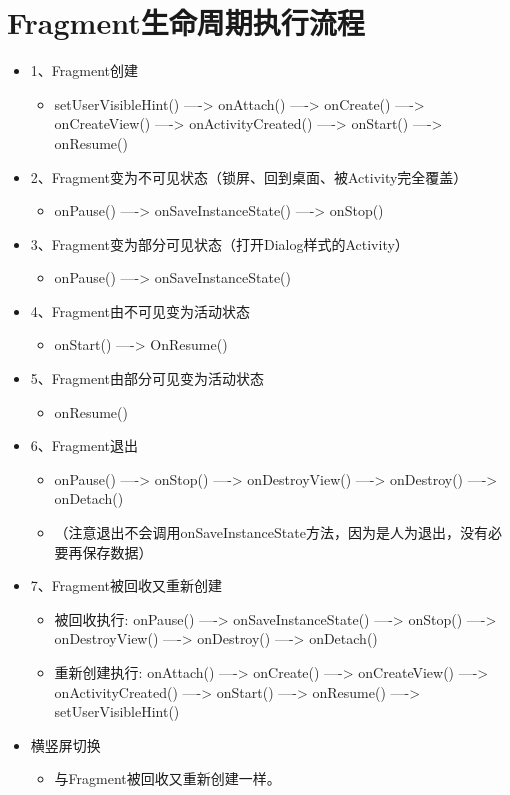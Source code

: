 \documentclass[9pt, b5paaper]{book}
\begin{document}
\section{Fragment生命周期执行流程}
\label{sec-2-4}
\begin{itemize}
\item 1、Fragment创建
\begin{itemize}
\item setUserVisibleHint() ----> onAttach() ----> onCreate() ----> onCreateView() ----> onActivityCreated() ----> onStart() ----> onResume()
\end{itemize}
\item 2、Fragment变为不可见状态（锁屏、回到桌面、被Activity完全覆盖）
\begin{itemize}
\item onPause() ----> onSaveInstanceState() ----> onStop()
\end{itemize}
\item 3、Fragment变为部分可见状态（打开Dialog样式的Activity）
\begin{itemize}
\item onPause() ----> onSaveInstanceState()
\end{itemize}
\item 4、Fragment由不可见变为活动状态
\begin{itemize}
\item onStart() ----> OnResume()
\end{itemize}
\item 5、Fragment由部分可见变为活动状态
\begin{itemize}
\item onResume()
\end{itemize}
\item 6、Fragment退出
\begin{itemize}
\item onPause() ----> onStop() ----> onDestroyView() ----> onDestroy() ----> onDetach()
\item （注意退出不会调用onSaveInstanceState方法，因为是人为退出，没有必要再保存数据）
\end{itemize}
\item 7、Fragment被回收又重新创建
\begin{itemize}
\item 被回收执行: onPause() ----> onSaveInstanceState() ----> onStop() ----> onDestroyView() ----> onDestroy() ----> onDetach()
\item 重新创建执行: onAttach() ----> onCreate() ----> onCreateView() ----> onActivityCreated() ----> onStart() ----> onResume() ----> setUserVisibleHint()
\end{itemize}
\item 横竖屏切换
\begin{itemize}
\item 与Fragment被回收又重新创建一样。
\end{itemize}
\end{itemize}
\end{document}
